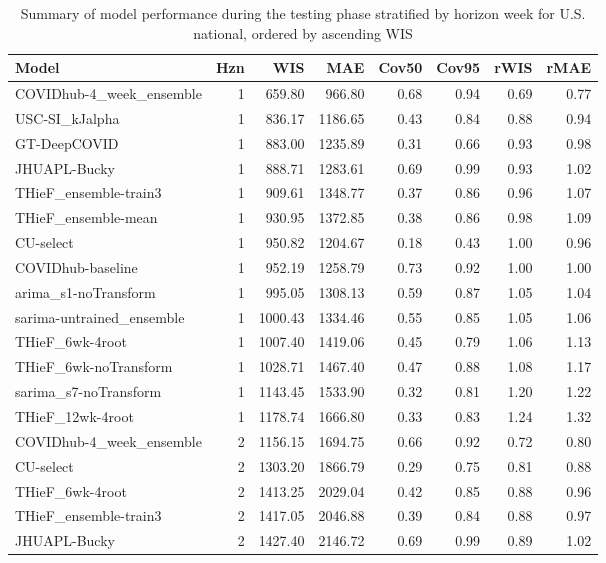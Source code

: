 \documentclass[12pt]{article}
\begin{document}
\begingroup\renewcommand{\arraystretch}{0.75}
\begin{longtable}{lrrrrrrr}
\caption{Summary of model performance during the testing phase stratified by horizon week for U.S. national, ordered by ascending WIS} \\ 
  \hline
Model & Hzn & WIS & MAE & Cov50 & Cov95 & rWIS & rMAE \\ 
  \hline
COVIDhub-4\_week\_ensemble & 1 & 659.80 & 966.80 & 0.68 & 0.94 & 0.69 & 0.77 \\ 
  USC-SI\_kJalpha & 1 & 836.17 & 1186.65 & 0.43 & 0.84 & 0.88 & 0.94 \\ 
  GT-DeepCOVID & 1 & 883.00 & 1235.89 & 0.31 & 0.66 & 0.93 & 0.98 \\ 
  JHUAPL-Bucky & 1 & 888.71 & 1283.61 & 0.69 & 0.99 & 0.93 & 1.02 \\ 
  THieF\_ensemble-train3 & 1 & 909.61 & 1348.77 & 0.37 & 0.86 & 0.96 & 1.07 \\ 
  THieF\_ensemble-mean & 1 & 930.95 & 1372.85 & 0.38 & 0.86 & 0.98 & 1.09 \\ 
  CU-select & 1 & 950.82 & 1204.67 & 0.18 & 0.43 & 1.00 & 0.96 \\ 
  COVIDhub-baseline & 1 & 952.19 & 1258.79 & 0.73 & 0.92 & 1.00 & 1.00 \\ 
  arima\_s1-noTransform & 1 & 995.05 & 1308.13 & 0.59 & 0.87 & 1.05 & 1.04 \\ 
  sarima-untrained\_ensemble & 1 & 1000.43 & 1334.46 & 0.55 & 0.85 & 1.05 & 1.06 \\ 
  THieF\_6wk-4root & 1 & 1007.40 & 1419.06 & 0.45 & 0.79 & 1.06 & 1.13 \\ 
  THieF\_6wk-noTransform & 1 & 1028.71 & 1467.40 & 0.47 & 0.88 & 1.08 & 1.17 \\ 
  sarima\_s7-noTransform & 1 & 1143.45 & 1533.90 & 0.32 & 0.81 & 1.20 & 1.22 \\ 
  THieF\_12wk-4root & 1 & 1178.74 & 1666.80 & 0.33 & 0.83 & 1.24 & 1.32 \\ 
  COVIDhub-4\_week\_ensemble & 2 & 1156.15 & 1694.75 & 0.66 & 0.92 & 0.72 & 0.80 \\ 
  CU-select & 2 & 1303.20 & 1866.79 & 0.29 & 0.75 & 0.81 & 0.88 \\ 
  THieF\_6wk-4root & 2 & 1413.25 & 2029.04 & 0.42 & 0.85 & 0.88 & 0.96 \\ 
  THieF\_ensemble-train3 & 2 & 1417.05 & 2046.88 & 0.39 & 0.84 & 0.88 & 0.97 \\ 
  JHUAPL-Bucky & 2 & 1427.40 & 2146.72 & 0.69 & 0.99 & 0.89 & 1.02 \\ 

\end{longtable}
\end{document}
